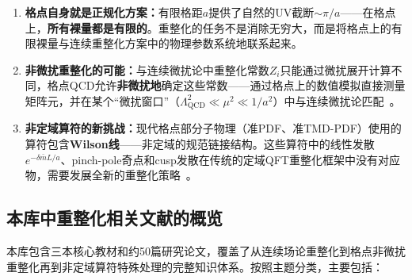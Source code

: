 \documentclass[12pt,a4paper]{ctexart}
\theoremstyle{definition}
\begin{document}
\begin{enumerate}[leftmargin=*]
    \item \textbf{格点自身就是正规化方案：}有限格距$a$提供了自然的UV截断$\sim \pi/a$——在格点上，\textbf{所有裸量都是有限的}。重整化的任务不是消除无穷大，而是将格点上的有限裸量与连续重整化方案中的物理参数系统地联系起来。

    \item \textbf{非微扰重整化的可能：}与连续微扰论中重整化常数$Z_i$只能通过微扰展开计算不同，格点QCD允许\textbf{非微扰地}确定这些常数——通过格点上的数值模拟直接测量矩阵元，并在某个``微扰窗口''（$\Lambda_{\text{QCD}}^2 \ll \mu^2 \ll 1/a^2$）中与连续微扰论匹配~\cite{GattringerLang2010}。

    \item \textbf{非定域算符的新挑战：}现代格点部分子物理（准PDF、准TMD-PDF）使用的算符包含\textbf{Wilson线}——非定域的规范链接结构。这些算符中的线性发散$e^{-\delta\bar m L/a}$、pinch-pole奇点和cusp发散在传统的定域QFT重整化框架中没有对应物，需要发展全新的重整化策略~\cite{Zhang2022renormTMD,Huo2021self,Chen2018WLrenorm}。
\end{enumerate}

\subsection{本库中重整化相关文献的概览}

本库包含三本核心教材和约50篇研究论文，覆盖了从连续场论重整化到格点非微扰重整化再到非定域算符特殊处理的完整知识体系。按照主题分类，主要包括：
\end{document}
